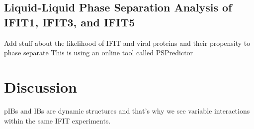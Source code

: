 \subsection{Liquid-Liquid Phase Separation Analysis of IFIT1, IFIT3, and IFIT5} \label{subsec:Liquid-Liquid Phase Separation Analysis of IFIT1, IFIT3, and IFIT5}
Add stuff about the likelihood of IFIT and viral proteins and their propensity to phase separate \newline
This is using an online tool called PSPredictor


\section{Discussion} \label{sec:Discussion-Chapter4}
pIBs and IBs are dynamic structures and that’s why we see variable interactions within the same IFIT experiments.